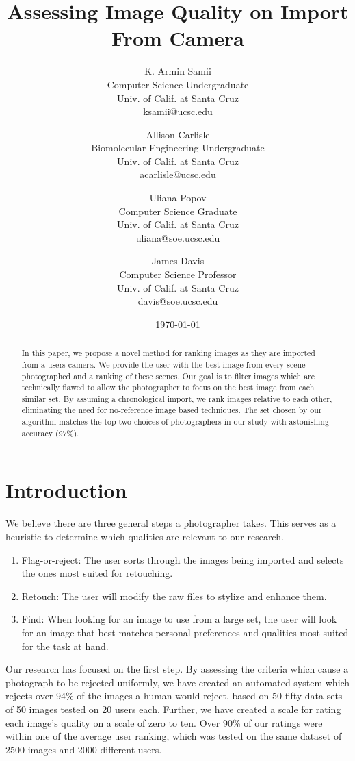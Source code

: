 \documentclass[twocolumn]{article}
\title{
   Assessing Image Quality on Import From Camera
} %
\author{
   K. Armin Samii\\
   Computer Science Undergraduate\\
   Univ. of Calif. at Santa Cruz\\
   ksamii@ucsc.edu
  \and
   Allison Carlisle\\
   Biomolecular Engineering Undergraduate\\
   Univ. of Calif. at Santa Cruz\\
   acarlisle@ucsc.edu
  \and
   Uliana Popov\\
   Computer Science Graduate\\
   Univ. of Calif. at Santa Cruz\\
   uliana@soe.ucsc.edu
  \and
   James Davis\\
   Computer Science Professor\\
   Univ. of Calif. at Santa Cruz\\
   davis@soe.ucsc.edu
}
\date{\today}
\begin{document}
\maketitle

\begin{abstract}
In this paper, we propose a novel method for ranking images as they are imported from a users camera. We provide the user with the best image from every scene photographed and a ranking of these scenes. Our goal is to filter images which are technically flawed to allow the photographer to focus on the best image from each similar set. By assuming a chronological import, we rank images relative to each other, eliminating the need for no-reference image based techniques. The set chosen by our algorithm matches the top two choices of photographers in our study with astonishing accuracy (97\%).
\end{abstract}
\section{Introduction}
We believe there are three general steps a photographer takes. This serves as a heuristic to determine which qualities are relevant to our research.
\begin{enumerate}
\item Flag-or-reject: The user sorts through the images being imported and selects the ones most suited for retouching.
\item Retouch: The user will modify the raw files to stylize and enhance them.
\item Find: When looking for an image to use from a large set, the user will look for an image that best matches personal preferences and qualities most suited for the task at hand.
\end{enumerate}
Our research has focused on the first step. By assessing the criteria which cause a photograph to be rejected uniformly, we have created an automated system which rejects over 94\% of the images a human would reject, based on 50 \cite{Yeh:2010:PPR:1873951.1873963}fifty data sets of 50 images tested on 20 users each. Further, we have created a scale for rating each image's quality on a scale of zero to ten. Over 90\% of our ratings were within one of the average user ranking, which was tested on the same dataset of 2500 images and 2000 different users. %
\end{document}
